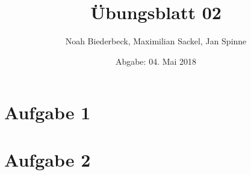 \documentclass{scrartcl}
\title{Übungsblatt 02}
\author{%
  Noah Biederbeck, Maximilian Sackel, Jan Spinne
}
\date{Abgabe: 04. Mai 2018}
\begin{document}
\maketitle

\section*{Aufgabe 1}
\section*{Aufgabe 2}
\end{document}

